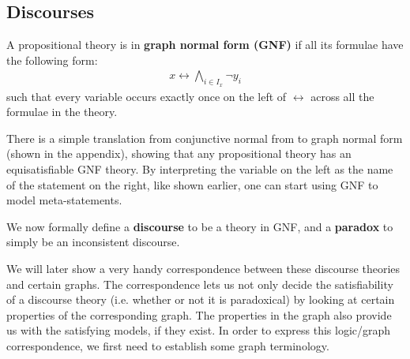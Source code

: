\subsection{Discourses}
\label{sub:Discourses}
A propositional theory is in \textbf{graph normal form (GNF)} if all its formulae have the following form:
\begin{align}
  x \leftrightarrow \bigwedge_{i \in I_x} \neg y_i
\end{align}
such that every variable occurs exactly once on the left of $\leftrightarrow$ across all the formulae in the theory.

There is a simple translation from conjunctive normal from to graph normal form (shown in the appendix), showing that any propositional theory has an equisatisfiable GNF theory.
By interpreting the variable on the left as the name of the statement on the right, like shown earlier, one can start using GNF to model meta-statements.

We now formally define a \textbf{discourse} to be a theory in GNF, and a \textbf{paradox} to simply be an inconsistent discourse.

We will later show a very handy correspondence between these discourse theories and certain graphs.
The correspondence lets us not only decide the satisfiability of a discourse theory (i.e. whether or not it is paradoxical) by looking at certain properties of the corresponding graph.
The properties in the graph also provide us with the satisfying models, if they exist.
In order to express this logic/graph correspondence, we first need to establish some graph terminology.
